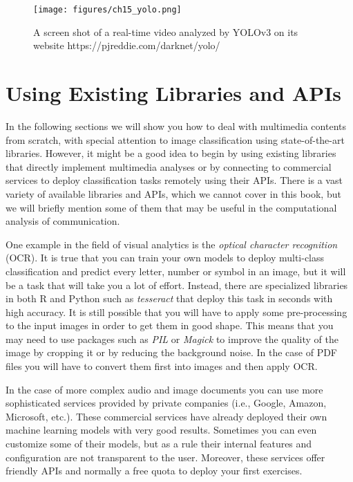 \begin{figure}
\centering
\texttt{[image: figures/ch15\_yolo.png]}
\caption{A screen shot of a real-time video analyzed by YOLOv3 on its website https://pjreddie.com/darknet/yolo/}
\label{fig:yolo}
\end{figure}


%

\section{Using Existing Libraries and APIs}
\label{sec:apivisions}

In the following sections we will show you how to deal with multimedia contents from scratch, with special attention to image classification using state-of-the-art libraries. However, it might be a good idea to begin by using existing libraries that directly implement multimedia analyses or by connecting to commercial services to deploy classification tasks remotely using their APIs. There is a vast variety of available libraries and APIs, which we cannot cover in this book, but we will briefly mention some of them that may be useful in the computational analysis of communication.

One example in the field of visual analytics is the \textit{optical character recognition} (OCR). It is true that you can train your own models to deploy multi-class classification and predict every letter, number or symbol in an image, but it will be a task that will take you a lot of effort. Instead, there are specialized libraries in both R and Python such as \emph{tesseract} that deploy this task in seconds with high accuracy. It is still possible that you will have to apply some pre-processing to the input images in order to get them in good shape. This means that you may need to use packages such as \emph{PIL} or \emph{Magick} to improve the quality of the image by cropping it or by reducing the background noise.  In the case of PDF files you will have to convert them first into images and then apply OCR.

In the case of more complex audio and image documents you can use more sophisticated services provided by private companies (i.e., Google, Amazon, Microsoft, etc.). These commercial services have already deployed their own machine learning models with very good results. Sometimes you can even customize some of their models, but as a rule their internal features and configuration are not transparent to the user. Moreover, these services offer friendly APIs and normally a free quota to deploy your first exercises.

